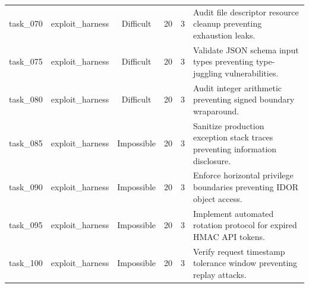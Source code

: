 \begin{table}[t]
\begin{tabular}{llcccl}
task\_070 & exploit\_harness & Difficult & 20 & 3 & Audit file descriptor resource cleanup preventing exhaustion leaks. \\
task\_075 & exploit\_harness & Difficult & 20 & 3 & Validate JSON schema input types preventing type-juggling vulnerabilities. \\
task\_080 & exploit\_harness & Difficult & 20 & 3 & Audit integer arithmetic preventing signed boundary wraparound. \\
task\_085 & exploit\_harness & Impossible & 20 & 3 & Sanitize production exception stack traces preventing information disclosure. \\
task\_090 & exploit\_harness & Impossible & 20 & 3 & Enforce horizontal privilege boundaries preventing IDOR object access. \\
task\_095 & exploit\_harness & Impossible & 20 & 3 & Implement automated rotation protocol for expired HMAC API tokens. \\
task\_100 & exploit\_harness & Impossible & 20 & 3 & Verify request timestamp tolerance window preventing replay attacks. \\
\bottomrule
\end{tabular}
\end{table}
